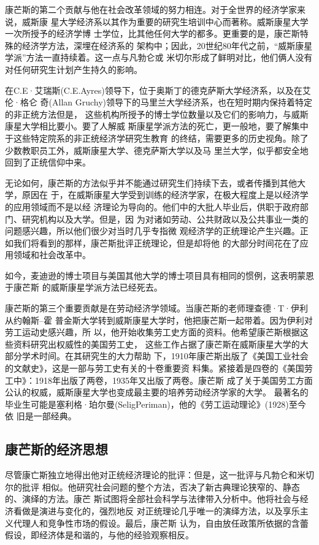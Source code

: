 康芒斯的第二个贡献与他在社会改革领域的努力相连。对于全世界的经济学家来说，威斯康
星大学经济系以其作为重要的研究生培训中心而著称。威斯康星大学一次所授予的经济学博
士学位，比其他任何大学的都多。更重要的是，康芒斯特殊的经济学方法，深埋在经济系的
架构中；因此，20世纪80年代之前，“威斯康星学派”方法一直持续着。这一点与凡勃仑或
米切尔形成了鲜明对比，他们俩人没有对任何研究生计划产生持久的影响。

在C.E·艾瑞斯(C.E.Ayres)领导下，位于奥斯丁的德克萨斯大学经济系，以及在艾伦·格仑
奇(Allan Gruchy)领导下的马里兰大学经济系，也在短时期内保持着特定的非正统方法但是，
这些机构所授予的博士学位数量以及它们的影响力，与威斯康星大学相比要小。要了人解威
斯康星学派方法的死亡，更一般地，要了解集中于这些特定院系的非正统经济学研究生教育
的终结，需要更多的历史视角。除了少数教职员工外，威斯康星大学、德克萨斯大学以及马
里兰大学，似乎都安全地回到了正统信仰中来。

无论如何，康芒斯的方法似乎并不能通过研究生们持续下去，或者传播到其他大学，原因在
于，在威斯康星大学受到训练的经济学家，在极大程度上是以经济学的应用领域而不是以经
济理论为导向的。他们中的大批人毕业后，供职于政府部门、研究机构以及大学。但是，因
为对诸如劳动、公共财政以及公共事业一类的问题感兴趣，所以他们很少对当时几乎专指微
观经济学的正统理论产生兴趣。正如我们将看到的那样，康芒斯批评正统理论，但是却将他
的大部分时间花在了应用领域和社会改革中。

如今，麦迪逊的博士项目与美国其他大学的博士项目具有相同的惯例，这表明蒙恩于康芒斯
的威斯康星学派方法已经死去。

康芒斯的第三个重要贡献是在劳动经济学领域。当康芒斯的老师理查德·T·伊利从约翰斯--霍
普金斯大学转到威斯康星大学时，他把康芒斯一起带着。因为伊利对劳工运动史感兴趣，所
以，他开始收集劳工史方面的资料。他希望康芒斯根据这些资料研究出权威性的美国劳工史，
这些工作占据了康芒斯在威斯康星大学的大部分学术时间。在其研究生的大力帮助
下，1910年康芒斯出版了《美国工业社会的文献史》，这是一部与劳工史有关的十卷重要资
料集。紧接着是四卷的《美国劳工中》：1918年出版了两卷，1935年又出版了两卷。康芒斯
成了关于美国劳工方面公认的权威，威斯康星大学也变成最主要的培养劳动经济学家的大学。
最著名的毕业生可能是塞利格·珀尔曼(SeligPeriman)，他的《劳工运动理论》(1928)至今依
旧是一部经典。

\subsection{康芒斯的经济思想}

尽管康亡斯独立地得出他对正统经济理论的批评：但是，这一批评与凡勃仑和米切尔的批评
相似。他研究社会问题的整个方法，否决了新古典理论狭窄的、静态的、演绎的方法。康芒
斯试图将全部社会科学与法律带入分析中。他将社会与经济看做是演进与变化的，强烈地反
对正统理论几乎唯一的演绎方法，以及享乐主义代理人和竞争性市场的假设。最后，康芒斯
认为，自由放任政策所依据的含蕾假设，即经济体是和谐的，与他的经验观察相反。


